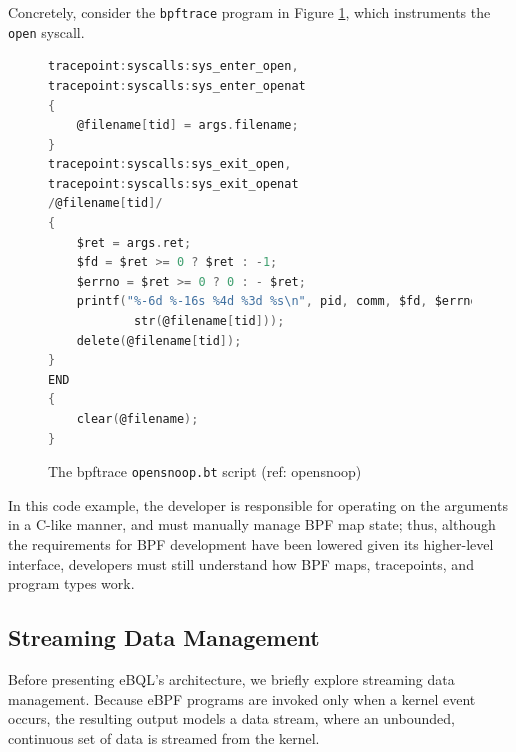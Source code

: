 Concretely, consider the \texttt{bpftrace} program in Figure \ref{code:bpftrace-ex}, which
instruments the \texttt{open} syscall.

\begin{figure}[htpb]
\begin{lstlisting}[language=C]
tracepoint:syscalls:sys_enter_open,
tracepoint:syscalls:sys_enter_openat
{
    @filename[tid] = args.filename;
}
tracepoint:syscalls:sys_exit_open,
tracepoint:syscalls:sys_exit_openat
/@filename[tid]/
{
    $ret = args.ret;
    $fd = $ret >= 0 ? $ret : -1;
    $errno = $ret >= 0 ? 0 : - $ret;
    printf("%-6d %-16s %4d %3d %s\n", pid, comm, $fd, $errno,
            str(@filename[tid]));
    delete(@filename[tid]);
}
END
{
    clear(@filename);
}
\end{lstlisting}

    \caption{The bpftrace \texttt{opensnoop.bt} script (ref: opensnoop)}
    \label{code:bpftrace-ex}
\end{figure}

In this code example, the developer is responsible for operating on the arguments in a C-like
manner, and must manually manage BPF map state; thus, although the requirements for BPF development
have been lowered given its higher-level interface, developers must still understand how BPF maps,
tracepoints, and program types work.

\subsection{Streaming Data Management}

Before presenting eBQL's architecture, we briefly explore streaming data management. Because eBPF
programs are invoked only when a kernel event occurs, the resulting output models a data stream,
where an unbounded, continuous set of data is streamed from the kernel.

